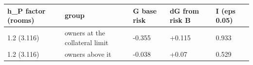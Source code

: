 \begingroup\small
\setlength{\tabcolsep}{3pt}
\renewcommand{\arraystretch}{1.04}
\begin{tabularx}{\linewidth}{XXXXX}
\toprule
h\_P factor (rooms) & group & G base risk & dG from risk B & I (eps 0.05) \\
\midrule
1.2 (3.116) & owners at the collateral limit & -0.355 & +0.115 & 0.933 \\
1.2 (3.116) & owners above it & -0.038 & +0.07 & 0.529 \\
\bottomrule
\end{tabularx}
\endgroup
